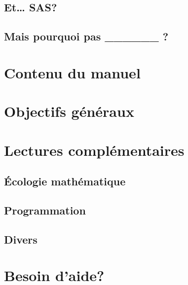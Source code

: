 \documentclass[]{book}
\begin{document}
\hypertarget{et-sas}{%
\subsection{Et\ldots{} SAS?}\label{et-sas}}

\hypertarget{mais-pourquoi-pas-______}{%
\subsection{Mais pourquoi pas \_\_\_\_\_\_
?}\label{mais-pourquoi-pas-______}}

\hypertarget{contenu-du-manuel}{%
\section{Contenu du manuel}\label{contenu-du-manuel}}

\hypertarget{objectifs-guxe9nuxe9raux}{%
\section{Objectifs généraux}\label{objectifs-guxe9nuxe9raux}}

\hypertarget{lectures-compluxe9mentaires}{%
\section{Lectures complémentaires}\label{lectures-compluxe9mentaires}}

\hypertarget{uxe9cologie-mathuxe9matique}{%
\subsection{Écologie mathématique}\label{uxe9cologie-mathuxe9matique}}

\hypertarget{programmation}{%
\subsection{Programmation}\label{programmation}}

\hypertarget{divers}{%
\subsection{Divers}\label{divers}}

\hypertarget{besoin-daide}{%
\section{Besoin d'aide?}\label{besoin-daide}}
\end{document}
